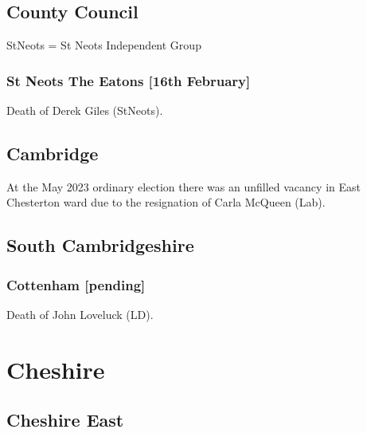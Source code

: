 \documentclass[a4paper,openany]{book}
\begin{document}
\begin{resultsiii}
\subsection*{County Council}

StNeots = St Neots Independent Group

\subsubsection*{St Neots The Eatons \hspace*{\fill}\nolinebreak[1]%
	\enspace\hspace*{\fill}
	[16th February]}


Death of Derek Giles (StNeots).

\subsection*{Cambridge}

At the May 2023 ordinary election there was an unfilled vacancy in East Chesterton ward due to the resignation of Carla McQueen (Lab).%

\subsection*{South Cambridgeshire}

\subsubsection*{Cottenham \hspace*{\fill}\nolinebreak[1]%
	\enspace\hspace*{\fill}
	[pending]}


Death of John Loveluck (LD).

\section{Cheshire}

\subsection*{Cheshire East}


\end{resultsiii}
\end{document}
